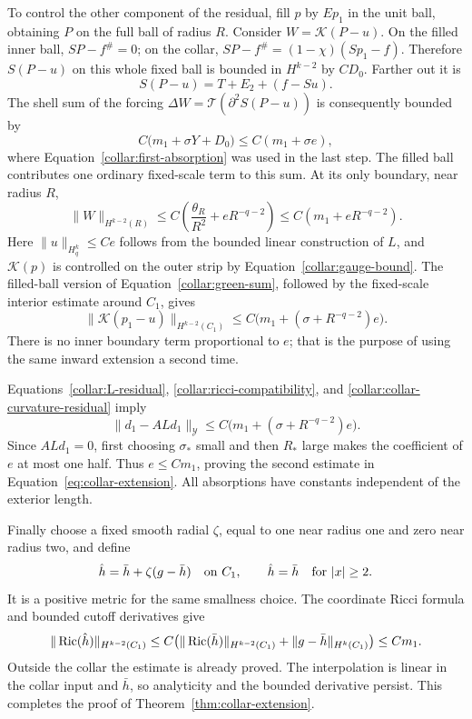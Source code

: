 To control the other component of the residual, fill \(p\) by
\(Ep_1\) in the unit ball, obtaining \(P\) on the full ball of
radius \(R\).  Consider \(W=\mathcal K(P-u)\).  On the filled
inner ball, \(SP-f^\#=0\); on the collar,
\(SP-f^\#=(1-\chi)(Sp_1-f)\).  Therefore
\(S(P-u)\) on this whole fixed ball is bounded in
\(H^{k-2}\) by \(CD_0\).  Farther out it is
\[
 S(P-u)=T+E_2+(f-Su).
\]
The shell sum of the forcing
\(\Delta W=\mathcal T(\partial^2S(P-u))\) is consequently
bounded by
\[
 C\bigl(m_1+\sigma Y+D_0\bigr)
     \le C(m_1+\sigma e),
\]
where Equation~\eqref{collar:first-absorption} was used in the
last step.  The filled ball contributes one ordinary fixed-scale
term to this sum.  At its only boundary, near radius \(R\),
\begin{equation}
 \|W\|_{H^{k-2}(R)}
 \le C\left(\frac{\theta_R}{R^2}+eR^{-q-2}\right)
 \le C(m_1+eR^{-q-2}).
 \label{collar:outer-curvature}
\end{equation}
Here \(\|u\|_{H^k_q}\le Ce\) follows from the bounded linear
construction of \(L\), and \(\mathcal K(p)\) is controlled on
the outer strip by Equation~\eqref{collar:gauge-bound}.
The filled-ball version of Equation~\eqref{collar:green-sum},
followed by the fixed-scale interior estimate around \(C_1\), gives
\begin{equation}
 \|\mathcal K(p_1-u)\|_{H^{k-2}(C_1)}
       \le C\bigl(m_1+(\sigma+R^{-q-2})e\bigr).
 \label{collar:collar-curvature-residual}
\end{equation}
There is no inner boundary term proportional to \(e\); that is
the purpose of using the same inward extension a second time.

Equations~\eqref{collar:L-residual},
\eqref{collar:ricci-compatibility}, and
\eqref{collar:collar-curvature-residual} imply
\[
 \|d_1-ALd_1\|_{\mathcal Y}
       \le C\bigl(m_1+(\sigma+R^{-q-2})e\bigr).
\]
Since \(ALd_1=0\), first choosing \(\sigma_*\) small and then
\(R_*\) large makes the coefficient of \(e\) at most one half.
Thus \(e\le Cm_1\), proving the second estimate in
Equation~\eqref{eq:collar-extension}.  All absorptions have
constants independent of the exterior length.

Finally choose a fixed smooth radial \(\zeta\), equal to one
near radius one and zero near radius two, and define
\[
 \hat h=\bar h+\zeta(g-\bar h)\quad\hbox{on }C_1,
 \qquad \hat h=\bar h\quad\hbox{for }|x|\ge2.
\]
It is a positive metric for the same smallness choice.  The
coordinate Ricci formula and bounded cutoff derivatives give
\[
 \|\operatorname{Ric}(\hat h)\|_{H^{k-2}(C_1)}
 \le C\bigl(\|\operatorname{Ric}(\bar h)\|_{H^{k-2}(C_1)}
                  +\|g-\bar h\|_{H^k(C_1)}\bigr)\le Cm_1.
\]
Outside the collar the estimate is already proved.  The
interpolation is linear in the collar input and \(\bar h\), so
analyticity and the bounded derivative persist.  This completes
the proof of Theorem~\ref{thm:collar-extension}.

